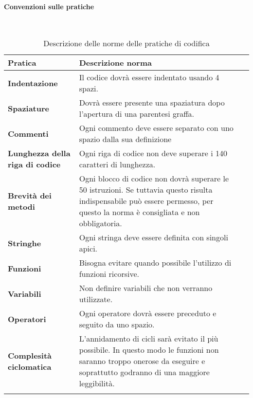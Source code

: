 \paragraph*{Convenzioni sulle pratiche}
\
{
	\setlength{\freewidth}{\dimexpr\textwidth-0\tabcolsep}
	\renewcommand{\arraystretch}{1.5}
	\setlength{\aboverulesep}{0pt}
	\setlength{\belowrulesep}{0pt}
	\begin{longtable}{L{.210\freewidth} L{.6\freewidth} L{.080\freewidth}}
		\toprule 
		\textbf{Pratica} & \textbf{Descrizione norma} \\
		\toprule
		\endhead		
		\textbf{Indentazione} & Il codice dovrà essere indentato usando 4 spazi. \\ 
		\textbf{Spaziature} & Dovrà essere presente una spaziatura dopo l'apertura di una parentesi graffa.  \\
		\textbf{Commenti} & Ogni commento deve essere separato con uno spazio dalla sua definizione \\ 
		\textbf{Lunghezza della riga di codice} & Ogni riga di codice non deve superare i 140 caratteri di lunghezza. \\
		\textbf{Brevità dei metodi} & Ogni blocco di codice non dovrà superare le 50 istruzioni. Se tuttavia questo risulta indispensabile può essere permesso, per questo la norma è consigliata e non obbligatoria.\\ 	
		\textbf{Stringhe} & Ogni stringa deve essere definita con singoli apici. \\
		\textbf{Funzioni} & Bisogna evitare quando possibile l'utilizzo di funzioni ricorsive.\\ 	
		\textbf{Variabili} & Non definire variabili che non verranno utilizzate.\\ 	
		\textbf{Operatori} & Ogni operatore dovrà essere preceduto e seguito da uno spazio.\\ 	
		\textbf{Complesità ciclomatica} & L'annidamento di cicli sarà evitato il più possibile. In questo modo le funzioni non saranno troppo onerose da eseguire e soprattutto godranno di una maggiore leggibilità. \\  			
		\bottomrule
		\hiderowcolors
		\caption{Descrizione delle norme delle pratiche di codifica}
	\end{longtable}
}
\newpage
